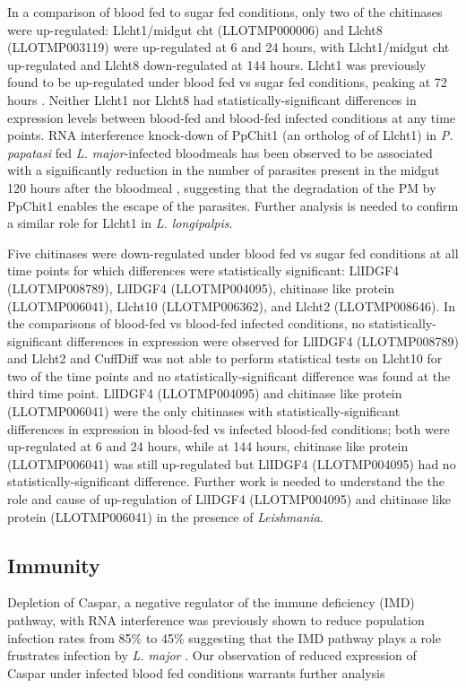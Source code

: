 In a comparison of blood fed to sugar fed conditions, only two of the chitinases were up-regulated: Llcht1/midgut cht (LLOTMP000006) and Llcht8 (LLOTMP003119) were up-regulated at 6 and 24 hours, with Llcht1/midgut cht up-regulated and Llcht8 down-regulated at 144 hours.  Llcht1 was previously found to be up-regulated under blood fed vs sugar fed conditions, peaking at 72 hours \cite{Ramalho-Ortigao2003}. Neither Llcht1 nor Llcht8 had statistically-significant differences in expression levels between blood-fed and blood-fed infected conditions at any time points. RNA interference knock-down of PpChit1 (an ortholog of of Llcht1) in \emph{P. papatasi} fed \emph{L. major}-infected bloodmeals has been observed to be associated with a significantly reduction in the number of parasites present in the midgut 120 hours after the bloodmeal \cite{Coutinho-abreu2010}, suggesting that the degradation of the PM by PpChit1 enables the escape of the parasites.  Further analysis is needed to confirm a similar role for Llcht1 in \emph{L. longipalpis}. 

Five chitinases were down-regulated under blood fed vs sugar fed conditions at all time points for which differences were statistically significant: LlIDGF4 (LLOTMP008789), LlIDGF4 (LLOTMP004095), chitinase like protein (LLOTMP006041), Llcht10 (LLOTMP006362), and Llcht2 (LLOTMP008646).  In the comparisons of blood-fed vs blood-fed infected conditions, no statistically-significant differences in expression were observed for LlIDGF4 (LLOTMP008789) and Llcht2 and CuffDiff was not able to perform statistical tests on Llcht10 for two of the time points and no statistically-significant difference was found at the third time point. LlIDGF4 (LLOTMP004095) and chitinase like protein (LLOTMP006041) were the only chitinases with statistically-significant differences in expression in blood-fed vs infected blood-fed conditions; both were up-regulated at 6 and 24 hours, while at 144 hours, chitinase like protein (LLOTMP006041) was still up-regulated but LlIDGF4 (LLOTMP004095) had no statistically-significant difference. Further work is needed to understand the the role and cause of up-regulation of LlIDGF4 (LLOTMP004095) and chitinase like protein (LLOTMP006041) in the presence of \emph{Leishmania}.

\subsection{Immunity}

Depletion of Caspar, a negative regulator of the immune deficiency (IMD) pathway, with RNA interference was previously shown to reduce population infection rates from 85\% to 45\% suggesting that the IMD pathway plays a role frustrates infection by \emph{L. major} \cite{Telleria2012}.  Our observation of reduced expression of Caspar under infected blood fed conditions warrants further analysis

